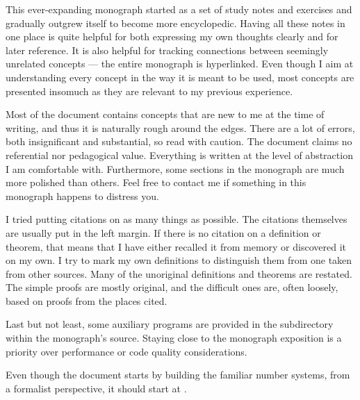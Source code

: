 
This ever-expanding monograph started as a set of study notes and exercises and gradually outgrew itself to become more encyclopedic. Having all these notes in one place is quite helpful for both expressing my own thoughts clearly and for later reference. It is also helpful for tracking connections between seemingly unrelated concepts --- the entire monograph is hyperlinked. Even though I aim at understanding every concept in the way it is meant to be used, most concepts are presented insomuch as they are relevant to my previous experience.

Most of the document contains concepts that are new to me at the time of writing, and thus it is naturally rough around the edges. There are a lot of errors, both insignificant and substantial, so read with caution. The document claims no referential nor pedagogical value. Everything is written at the level of abstraction I am comfortable with. Furthermore, some sections in the monograph are much more polished than others. Feel free to contact me if something in this monograph happens to distress you.

I tried putting citations on as many things as possible. The citations themselves are usually put in the left margin. If there is no citation on a definition or theorem, that means that I have either recalled it from memory or discovered it on my own. I try to mark my own definitions to distinguish them from one taken from other sources. Many of the unoriginal definitions and theorems are restated. The simple proofs are mostly original, and the difficult ones are, often loosely, based on proofs from the places cited.

Last but not least, some auxiliary programs are provided in the  subdirectory within the monograph's source. Staying close to the monograph exposition is a priority over performance or code quality considerations.

Even though the document starts by building the familiar number systems, from a formalist perspective, it should start at .

